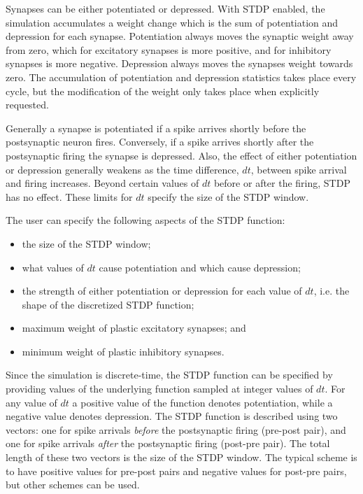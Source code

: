 \documentclass[a4paper]{article}
\begin{document}
Synapses can be either potentiated or depressed.
With STDP enabled,
	the simulation accumulates a weight change
	which is the sum of potentiation and depression for each synapse. 
Potentiation always moves the synaptic weight away from zero,
	which for excitatory synapses is more positive,
	and for inhibitory synapses is more negative.
Depression always moves the synapses weight towards zero.
The accumulation of potentiation and depression statistics takes place every cycle,
	but the modification of the weight only takes place when explicitly requested.

Generally a synapse is potentiated if a spike arrives shortly before the postsynaptic neuron fires. 
Conversely, if a spike arrives shortly after the postsynaptic firing the synapse is depressed. 
Also, the effect of either potentiation or depression generally weakens as the time difference, $dt$, 
	between spike arrival and firing increases. 
Beyond certain values of $dt$ before or after the firing, STDP has no effect. 
These limits for $dt$ specify the size of the STDP window.

The user can specify the following aspects of the STDP function:

\begin{itemize}
	\item the size of the STDP window;
	\item what values of $dt$ cause potentiation and which cause depression;
	\item the strength of either potentiation or depression for each value of $dt$, 
		i.e. the shape of the discretized STDP function;
	\item maximum weight of plastic excitatory synapses; and
	\item minimum weight of plastic inhibitory synapses.
\end{itemize}

Since the simulation is discrete-time,
	the STDP function can be specified by providing values of the underlying function
	sampled at integer values of $dt$.
For any value of $dt$ a positive value of the function denotes potentiation, 
	while a negative value denotes depression.
The STDP function is described using two vectors: 
	one for spike arrivals \emph{before} the postsynaptic firing (pre-post pair),
	and one for spike arrivals \emph{after} the postsynaptic firing (post-pre pair).
The total length of these two vectors is the size of the STDP window.
The typical scheme is to have positive values for pre-post pairs and negative values for post-pre pairs,
but other schemes can be used.
\end{document}
